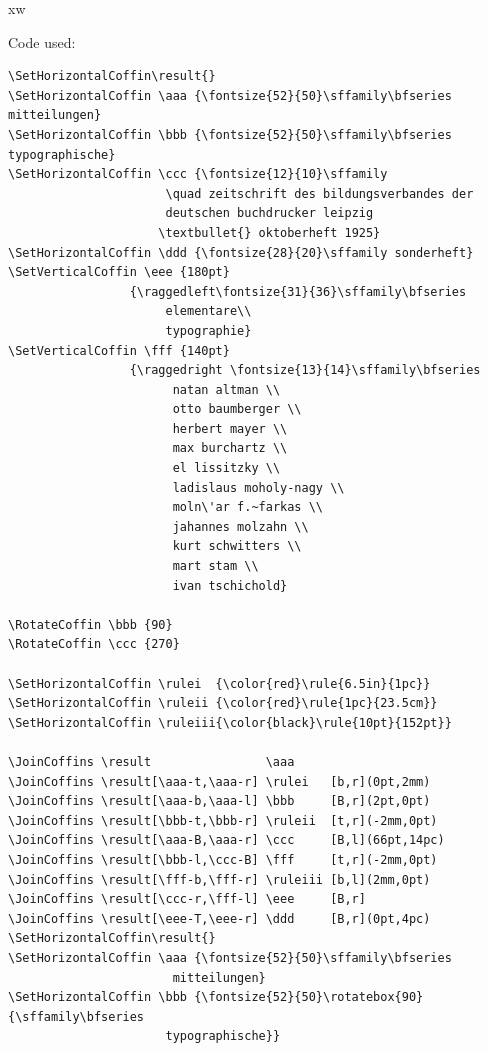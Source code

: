 \documentclass{article}
\begin{document}
\newpage
xw
\TypesetCoffin \result

\newpage

\vspace*{3cm}
\begin{center}
  {\Large Code used: \par}
\vspace*{1cm}


\begin{minipage}{14cm}
\begin{verbatim}
\SetHorizontalCoffin\result{}
\SetHorizontalCoffin \aaa {\fontsize{52}{50}\sffamily\bfseries mitteilungen}
\SetHorizontalCoffin \bbb {\fontsize{52}{50}\sffamily\bfseries typographische}
\SetHorizontalCoffin \ccc {\fontsize{12}{10}\sffamily 
                      \quad zeitschrift des bildungsverbandes der
                      deutschen buchdrucker leipzig 
                     \textbullet{} oktoberheft 1925}
\SetHorizontalCoffin \ddd {\fontsize{28}{20}\sffamily sonderheft}
\SetVerticalCoffin \eee {180pt}
                 {\raggedleft\fontsize{31}{36}\sffamily\bfseries 
                      elementare\\
                      typographie}
\SetVerticalCoffin \fff {140pt}
                 {\raggedright \fontsize{13}{14}\sffamily\bfseries 
                       natan altman \\
                       otto baumberger \\
                       herbert mayer \\
                       max burchartz \\
                       el lissitzky \\
                       ladislaus moholy-nagy \\
                       moln\'ar f.~farkas \\
                       jahannes molzahn \\
                       kurt schwitters \\
                       mart stam \\
                       ivan tschichold}
     
\RotateCoffin \bbb {90}
\RotateCoffin \ccc {270}

\SetHorizontalCoffin \rulei  {\color{red}\rule{6.5in}{1pc}}
\SetHorizontalCoffin \ruleii {\color{red}\rule{1pc}{23.5cm}}
\SetHorizontalCoffin \ruleiii{\color{black}\rule{10pt}{152pt}}

\JoinCoffins \result                \aaa 
\JoinCoffins \result[\aaa-t,\aaa-r] \rulei   [b,r](0pt,2mm)
\JoinCoffins \result[\aaa-b,\aaa-l] \bbb     [B,r](2pt,0pt)
\JoinCoffins \result[\bbb-t,\bbb-r] \ruleii  [t,r](-2mm,0pt)
\JoinCoffins \result[\aaa-B,\aaa-r] \ccc     [B,l](66pt,14pc)
\JoinCoffins \result[\bbb-l,\ccc-B] \fff     [t,r](-2mm,0pt)
\JoinCoffins \result[\fff-b,\fff-r] \ruleiii [b,l](2mm,0pt)
\JoinCoffins \result[\ccc-r,\fff-l] \eee     [B,r]
\JoinCoffins \result[\eee-T,\eee-r] \ddd     [B,r](0pt,4pc)
\SetHorizontalCoffin\result{}
\SetHorizontalCoffin \aaa {\fontsize{52}{50}\sffamily\bfseries
                       mitteilungen}
\SetHorizontalCoffin \bbb {\fontsize{52}{50}\rotatebox{90}{\sffamily\bfseries 
                      typographische}}


\end{verbatim}
\end{minipage}
\end{center}
\end{document}
